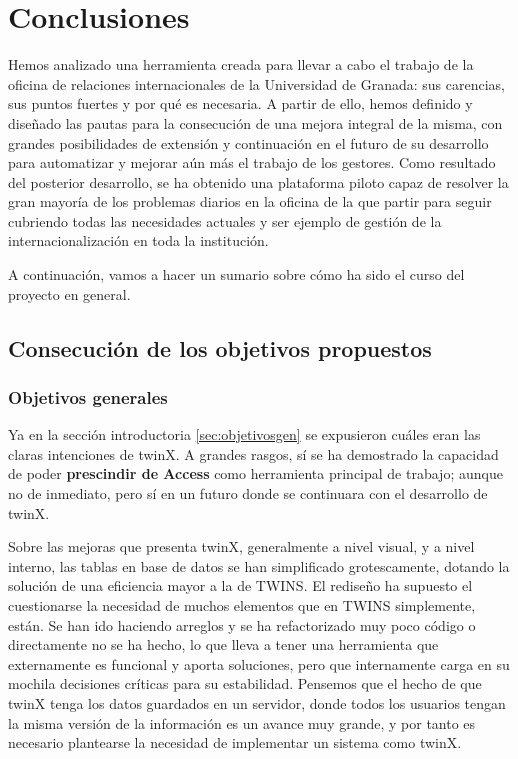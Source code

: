 \chapter{Conclusiones}

Hemos analizado una herramienta creada para llevar a cabo el trabajo de la oficina de relaciones internacionales de la Universidad de Granada: sus carencias, sus puntos fuertes y por qué es necesaria. A partir de ello, hemos definido y diseñado las pautas para la consecución de una mejora integral de la misma, con grandes posibilidades de extensión y continuación en el futuro de su desarrollo para automatizar y mejorar aún más el trabajo de los gestores. Como resultado del posterior desarrollo, se ha obtenido una plataforma piloto capaz de resolver la gran mayoría de los problemas diarios en la oficina de la que partir para seguir cubriendo todas las necesidades actuales y ser ejemplo de gestión de la internacionalización en toda la institución.

A continuación, vamos a hacer un sumario sobre cómo ha sido el curso del proyecto en general.

\section{Consecución de los objetivos propuestos}

\subsection{Objetivos generales}

Ya en la sección introductoria \ref{sec:objetivosgen} se expusieron cuáles eran las claras intenciones de twinX. A grandes rasgos, sí se ha demostrado la capacidad de poder \textbf{prescindir de Access\textregistered} como herramienta principal de trabajo; aunque no de inmediato, pero sí en un futuro donde se continuara con el desarrollo de twinX.

Sobre las mejoras que presenta twinX, generalmente a nivel visual, y a nivel interno, las tablas en base de datos se han simplificado grotescamente, dotando la solución de una eficiencia mayor a la de TWINS. El rediseño ha supuesto el cuestionarse la necesidad de muchos elementos que en TWINS simplemente, están. Se han ido haciendo arreglos y se ha refactorizado muy poco código o directamente no se ha hecho, lo que lleva a tener una herramienta que externamente es funcional y aporta soluciones, pero que internamente carga en su mochila decisiones críticas para su estabilidad. Pensemos que el hecho de que twinX tenga los datos guardados en un servidor, donde todos los usuarios tengan la misma versión de la información es un avance muy grande, y por tanto es necesario plantearse la necesidad de implementar un sistema como twinX.

